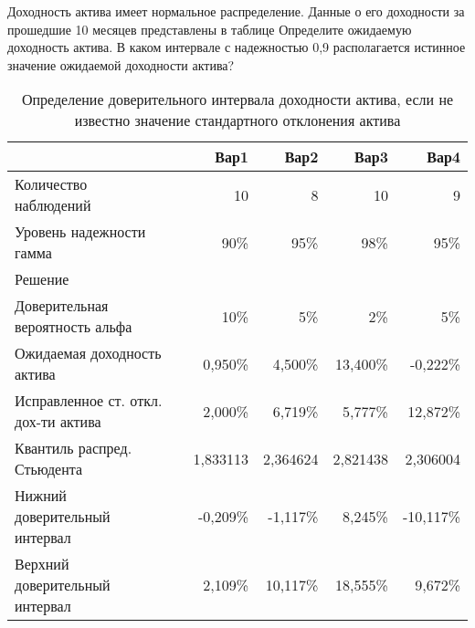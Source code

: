 \documentclass[12pt,a4paper]{article}
\begin{document}
\begin{taskrus}
Доходность актива имеет нормальное распределение. Данные о его доходности за прошедшие 10 месяцев представлены в таблице
Определите ожидаемую доходность актива. В каком интервале с надежностью 0,9 располагается истинное значение ожидаемой доходности актива?
\begin{table}[H]
  \centering
  \caption{Определение доверительного интервала доходности актива, если не известно значение стандартного отклонения актива
}
    \begin{tabular}{lrrrrr}
    \toprule
          &       & Вар1  & Вар2  & Вар3  & Вар4 \\
    \midrule
    Количество наблюдений &       & 10    & 8     & 10    & 9 \\
    Уровень надежности гамма &       & 90\%  & 95\%  & 98\%  & 95\% \\
    \midrule
    Решение &       &       &       &       &  \\
    \midrule
    Доверительная вероятность альфа &       & 10\%  & 5\%   & 2\%   & 5\% \\
    Ожидаемая доходность актива &       & 0,950\% & 4,500\% & 13,400\% & -0,222\% \\
    \specialcell{Исправленное ст. откл.\\дох-ти актива} &       & 2,000\% & 6,719\% & 5,777\% & 12,872\% \\
    Квантиль распред. Стьюдента &       & 1,833113 & 2,364624 & 2,821438 & 2,306004 \\
    Нижний доверительный интервал &       & -0,209\% & -1,117\% & 8,245\% & -10,117\% \\
    Верхний доверительный интервал &       & 2,109\% & 10,117\% & 18,555\% & 9,672\% \\
    \bottomrule
    \end{tabular}%
  \label{tab:addlabel}%
\end{table}%
\end{taskrus}
\end{document}
